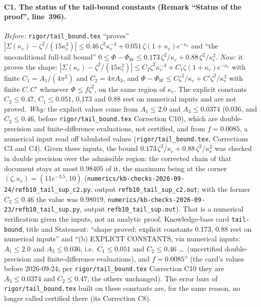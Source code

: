 \documentclass[11pt]{article}
\theoremstyle{accent}
\theoremstyle{definition}
\begin{document}
{\paragraph{C1. The status of the tail-bound constants (Remark ``Status of the proof'', line~396).}
\emph{Before:} \texttt{rigor/tail\_bound.tex} ``proves'' $|\Sigma(\kappa_c)-\zeta^2/(15\kappa_c^2)|
\le0.46\,\zeta^2\kappa_c^{-3}+0.051\,\zeta(1+\kappa_c)e^{-\kappa_c}$ and ``the unconditional
full-tail bound'' $0\le\Phi-\Phi_W\le0.173\,\zeta^2/\kappa_c+0.88\,\zeta^2/\kappa_c^2$.
\emph{Now:} it proves the shape: $|\Sigma(\kappa_c)-\zeta^2/(15\kappa_c^2)|\le C_2\zeta^2\kappa_c^{-3}
+C_1\zeta(1+\kappa_c)e^{-\kappa_c}$ with finite $C_1=A_1/(4\pi^2)$ and $C_2=4\pi A_3$, and
$\Phi-\Phi_W\le C\zeta^2/\kappa_c+C'\zeta^2/\kappa_c^2$ with finite $C,C'$ whenever $\Phi\le f\zeta^2$,
on the same region of $\kappa_c$.  The explicit constants $C_2\le0.47$, $C_1\le0.051$, $0.173$ and
$0.88$ rest on numerical inputs and are not proved.
\emph{Why:} the explicit values come from $A_1\le2.0$ and $A_3\le0.0374$ ($0.036$, and $C_2\le0.46$, before \texttt{rigor/tail\_bound.tex} Correction C10), which are double-precision
and finite-difference evaluations, not certified, and from $f=0.0085$, a numerical input read off
tabulated values (\texttt{rigor/tail\_bound.tex}, Corrections C3 and C4).  Given these inputs, the
bound $0.173\,\zeta^2/\kappa_c+0.88\,\zeta^2/\kappa_c^2$ was checked in double precision over the
admissible region: the corrected chain of that document stays at most $0.98405$ of it, the maximum
being at the corner $(\zeta,\kappa_c)=(11e^{-3.5},10)$
(\texttt{numerics/kb-checks-2026-09-24/refb10\_tail\_sup\_c2.py}, output
\texttt{refb10\_tail\_sup\_c2.out}; with the former $C_2\le0.46$ the value was $0.98019$,
\texttt{numerics/kb-checks-2026-09-23/refb10\_tail\_sup.py}, output \texttt{refb10\_tail\_sup.out}).
That is a numerical verification given the inputs, not an analytic proof.  Knowledge-base card
\texttt{tail-bound}, title and Statement: ``shape proved; explicit constants 0.173, 0.88 rest on
numerical inputs'' and ``(b) EXPLICIT CONSTANTS, via numerical inputs: $A_1\le2.0$ and
$A_3\le0.036$, i.e.\ $C_1\le0.051$ and $C_2\le0.46$ \dots\ (uncertified double-precision and
finite-difference evaluations), and $f=0.0085$'' (the card's values before 2026-09-24; per
\texttt{rigor/tail\_bound.tex} Correction C10 they are $A_3\le0.0374$ and $C_2\le0.47$, the others
unchanged).  The error bars of \texttt{rigor/tail\_bound.tex}
built on these constants are, for the same reason, no longer called certified there (its
Correction C8).

}
\end{document}
